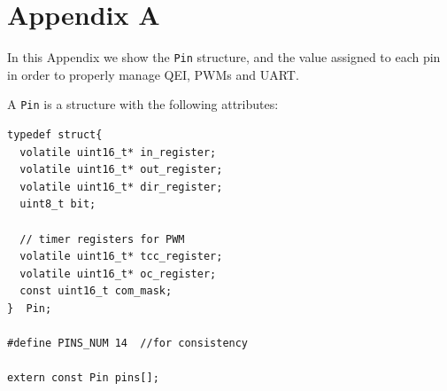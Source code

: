 \documentclass[10pt,a4paper, notitlepage]{report}
\begin{document}
\newpage
\section*{Appendix A} \label{sec:appendix}
In this Appendix we show the \texttt{Pin} structure, and the value assigned to each pin in order to properly manage QEI, PWMs and UART. 

A \texttt{Pin} is a structure with the following attributes:
\begin{lstlisting}[style=CStyle]
typedef struct{
  volatile uint16_t* in_register;
  volatile uint16_t* out_register;
  volatile uint16_t* dir_register;
  uint8_t bit;
  
  // timer registers for PWM
  volatile uint16_t* tcc_register;
  volatile uint16_t* oc_register;
  const uint16_t com_mask;
}  Pin;

#define PINS_NUM 14  //for consistency

extern const Pin pins[];
\end{lstlisting}
\end{document}
